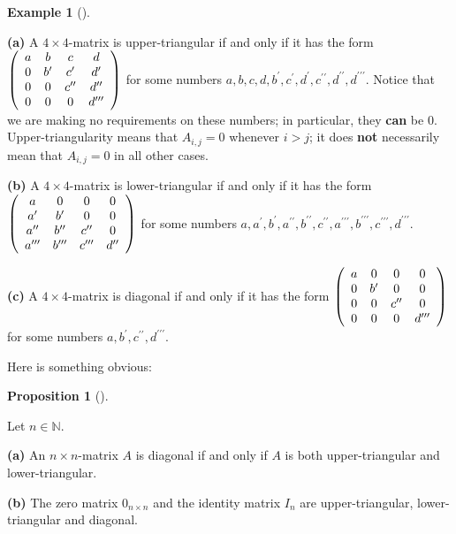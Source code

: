 \documentclass[numbers=enddot,12pt,final,onecolumn,notitlepage]{scrartcl}%
\theoremstyle{definition}
\newtheorem{prop}[theo]{Proposition}
\newenvironment{proposition}[1][]
{\begin{prop}[#1]\begin{leftbar}}
{\end{leftbar}\end{prop}}
\newtheorem{exam}[theo]{Example}
\newenvironment{example}[1][]
{\begin{exam}[#1]\begin{leftbar}}
{\end{leftbar}\end{exam}}
\begin{document}
\begin{example}
\label{exam.triangular}\textbf{(a)} A $4\times4$-matrix is upper-triangular if
and only if it has the form $\left(
\begin{array}
[c]{cccc}%
a & b & c & d\\
0 & b^{\prime} & c^{\prime} & d^{\prime}\\
0 & 0 & c^{\prime\prime} & d^{\prime\prime}\\
0 & 0 & 0 & d^{\prime\prime\prime}%
\end{array}
\right)  $ for some numbers $a,b,c,d,b^{\prime},c^{\prime},d^{\prime
},c^{\prime\prime},d^{\prime\prime},d^{\prime\prime\prime}$. Notice that we
are making no requirements on these numbers; in particular, they \textbf{can}
be $0$. Upper-triangularity means that $A_{i,j}=0$ whenever $i>j$; it does
\textbf{not} necessarily mean that $A_{i,j}=0$ in all other cases.

\textbf{(b)} A $4\times4$-matrix is lower-triangular if and only if it has the
form $\left(
\begin{array}
[c]{cccc}%
a & 0 & 0 & 0\\
a^{\prime} & b^{\prime} & 0 & 0\\
a^{\prime\prime} & b^{\prime\prime} & c^{\prime\prime} & 0\\
a^{\prime\prime\prime} & b^{\prime\prime\prime} & c^{\prime\prime\prime} &
d^{\prime\prime}%
\end{array}
\right)  $ for some numbers $a,a^{\prime},b^{\prime},a^{\prime\prime
},b^{\prime\prime},c^{\prime\prime},a^{\prime\prime\prime},b^{\prime
\prime\prime},c^{\prime\prime\prime},d^{\prime\prime\prime}$.

\textbf{(c)} A $4\times4$-matrix is diagonal if and only if it has the form
$\left(
\begin{array}
[c]{cccc}%
a & 0 & 0 & 0\\
0 & b^{\prime} & 0 & 0\\
0 & 0 & c^{\prime\prime} & 0\\
0 & 0 & 0 & d^{\prime\prime\prime}%
\end{array}
\right)  $ for some numbers $a,b^{\prime},c^{\prime\prime},d^{\prime
\prime\prime}$.
\end{example}

Here is something obvious:

\begin{proposition}
\label{prop.triangular.obvious}Let $n\in\mathbb{N}$.

\textbf{(a)} An $n\times n$-matrix $A$ is diagonal if and only if $A$ is both
upper-triangular and lower-triangular.

\textbf{(b)} The zero matrix $0_{n\times n}$ and the identity matrix $I_{n}$
are upper-triangular, lower-triangular and diagonal.
\end{proposition}
\end{document}
